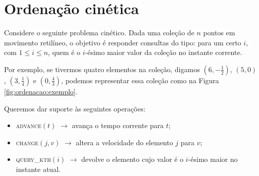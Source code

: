 
\chapter{Ordenação cinética}
Considere o seguinte problema cinético. Dada uma coleção de $n$
pontos em movimento retilíneo, o objetivo é responder consultas do
tipo: para um certo $i$, com $1 \leq i \leq n$, quem é o $i$-ésimo
maior valor da coleção no instante corrente.


Por exemplo, se tivermos quatro elementos na coleção, digamos
$\left(6, -\frac{1}{2}\right)$, $(5, 0)$, $\left(3,
\frac{1}{4}\right)$ e $\left(0, \frac{4}{3}\right)$, podemos
representar essa coleção como na Figura \ref{fig:ordenacao:exemplo}.



\newpage

Queremos dar suporte às seguintes operações:
\begin{itemize}
    \item \textsc{advance}$(t)$ $\rightarrow$ avança o tempo
    corrente para $t$;
    \item \textsc{change}$(j, v)$ $\rightarrow$ altera a
    velocidade do elemento $j$ para $v$;
    \item \textsc{query\_kth}$(i)$ $\rightarrow$ devolve o
    elemento cujo valor é o $i$-ésimo maior no instante atual.
\end{itemize}


